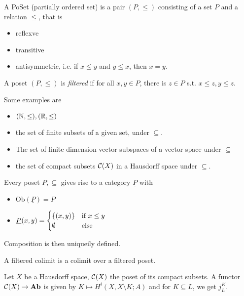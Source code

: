 \documentclass[language=english]{TemplateLecture}
\begin{document}
\begin{excursion}
    \begin{Definition}
        A PoSet (partially ordered set) is a pair \((P, \leq)\) consisting of a set \(P\) and a relation \(\leq\), that is
        \begin{itemize}
            \item reflexve
            \item transitive
            \item antisymmetric, i.e. if \(x \leq y\) and \(y \leq x\), then \(x = y\).
        \end{itemize}

        A poset \((P, \leq)\) is \emph{filtered} if for all \(x,y \in P\), there is \(z \in P\) s.t. \(x \leq z, y \leq z\).
    \end{Definition}

    Some examples are
    \begin{itemize}
        \item \((\mathbb{N}, \leq), (\mathbb{R}, \leq)\)
        \item the set of finite subsets of a given set, under \(\subseteq\).
        \item The set of finite dimension vector subspaces of a vector space under \(\subseteq\)
        \item the set of compact subsets \(\mathcal{C}(X)\) in a Hausdorff space under \(\subseteq\).
    \end{itemize}

    Every poset \(P, \subseteq\) gives rise to a category \(\underline{P}\) with
    \begin{itemize}
        \item \(\mathrm{Ob}(\underline P) = P\)
        \item \(\underline{P}(x,y) = \begin{cases}
            \{(x,y)\} & \text{if } x \leq y \\
            \emptyset & \text{else}
        \end{cases}\)
    \end{itemize}
    Composition is then uniqueily defined.

    A filtered colimit is a colimit over a filtered poset.
    \begin{example}
        Let \(X\) be a Hausdorff space, \(\mathcal{C}(X)\) the poset of its compact subsets. A functor \(\mathcal{C}(X) \to \mathbf{Ab}\) is given by \(K \mapsto H^i(X, X\setminus K; A)\) and for \(K \subseteq L\), we get \(j_L^K\).


\end{example}
\end{excursion}
\end{document}
